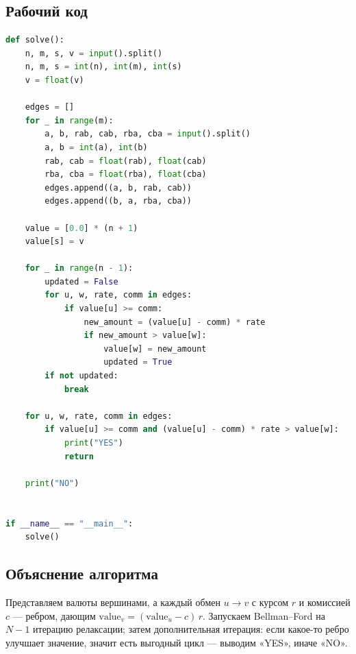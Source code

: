 \documentclass[a4paper,12pt]{article}
\begin{document}
\subsection*{Рабочий код}
\begin{lstlisting}[language=python]
def solve():
    n, m, s, v = input().split()
    n, m, s = int(n), int(m), int(s)
    v = float(v)

    edges = []
    for _ in range(m):
        a, b, rab, cab, rba, cba = input().split()
        a, b = int(a), int(b)
        rab, cab = float(rab), float(cab)
        rba, cba = float(rba), float(cba)
        edges.append((a, b, rab, cab))
        edges.append((b, a, rba, cba))

    value = [0.0] * (n + 1)
    value[s] = v

    for _ in range(n - 1):
        updated = False
        for u, w, rate, comm in edges:
            if value[u] >= comm:
                new_amount = (value[u] - comm) * rate
                if new_amount > value[w]:
                    value[w] = new_amount
                    updated = True
        if not updated:
            break

    for u, w, rate, comm in edges:
        if value[u] >= comm and (value[u] - comm) * rate > value[w]:
            print("YES")
            return

    print("NO")


if __name__ == "__main__":
    solve()
\end{lstlisting}
\subsection*{Объяснение алгоритма}
Представляем валюты вершинами, а каждый обмен \(u\to v\) с курсом \(r\) и комиссией \(c\) — ребром, дающим  $\mathrm{value}_v = (\mathrm{value}_u - c)\,r$. Запускаем Bellman–Ford на \(N-1\) итерацию релаксации; затем дополнительная итерация: если какое-то ребро улучшает значение, значит есть выгодный цикл — выводим «YES», иначе «NO».

\newpage
\end{document}
